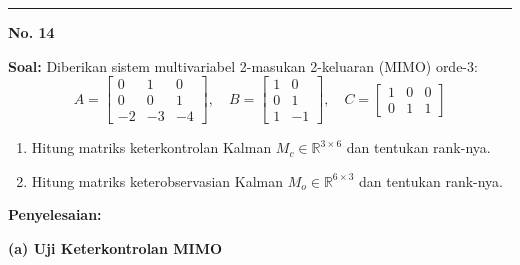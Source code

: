 \documentclass[11pt,a4paper]{article}
\begin{document}
\vspace{12pt}
\hrule
\vspace{10pt}

\textbf{\large No. 14}

\textbf{Soal:}  
Diberikan sistem multivariabel 2-masukan 2-keluaran (MIMO) orde-3:
$$A = \begin{bmatrix} 0 & 1 & 0 \\ 0 & 0 & 1 \\ -2 & -3 & -4 \end{bmatrix}, \quad B = \begin{bmatrix} 1 & 0 \\ 0 & 1 \\ 1 & -1 \end{bmatrix}, \quad C = \begin{bmatrix} 1 & 0 & 0 \\ 0 & 1 & 1 \end{bmatrix}$$
\begin{enumerate}[label=(\alph*)]
    \item Hitung matriks keterkontrolan Kalman $M_c \in \mathbb{R}^{3 \times 6}$ dan tentukan rank-nya.
    \item Hitung matriks keterobservasian Kalman $M_o \in \mathbb{R}^{6 \times 3}$ dan tentukan rank-nya.
\end{enumerate}

\textbf{Penyelesaian:}

\textbf{(a) Uji Keterkontrolan MIMO}
\end{document}
